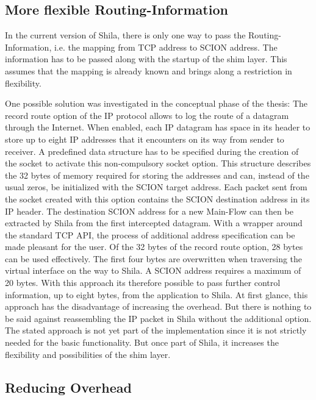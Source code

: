 \subsection*{More flexible Routing-Information}

In the current version of Shila, there is only one way to pass the Routing-Information, i.e. the mapping from TCP address to SCION address. The information has to be passed along with the startup of the shim layer. This assumes that the mapping is already known and brings along a restriction in flexibility.  

One possible solution was investigated in the conceptual phase of the thesis: The record route option of the IP protocol allows to log the route of a datagram through the Internet. When enabled, each IP datagram has space in its header to store up to eight IP addresses that it encounters on its way from sender to receiver. A predefined data structure has to be specified during the creation of the socket to activate this non-compulsory socket option. This structure describes the 32 bytes of memory required for storing the addresses and can, instead of the usual zeros, be initialized with the SCION target address. Each packet sent from the socket created with this option contains the SCION destination address in its IP header. The destination SCION address for a new Main-Flow can then be extracted by Shila from the first intercepted datagram. With a wrapper around the standard TCP API, the process of additional address specification can be made pleasant for the user. Of the 32 bytes of the record route option, 28 bytes can be used effectively. The first four bytes are overwritten when traversing the virtual interface on the way to Shila. A SCION address requires a maximum of 20 bytes. With this approach its therefore possible to pass further control information, up to eight bytes, from the application to Shila. At first glance, this approach has the disadvantage of increasing the overhead. But there is nothing to be said against reassembling the IP packet in Shila without the additional option. The stated approach is not yet part of the implementation since it is not strictly needed for the basic functionality. But once part of Shila, it increases the flexibility and possibilities of the shim layer.

\subsection*{Reducing Overhead}

